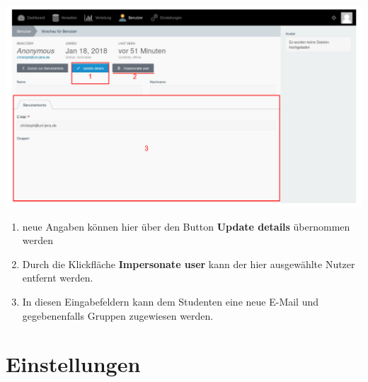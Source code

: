   
  \includegraphics[scale=0.3]{backend/img/users_3.pdf}
  \begin{enumerate}
   \item neue Angaben können hier über den Button \textbf{Update details} übernommen werden
   \item Durch die Klickfläche \textbf{Impersonate user} kann der hier ausgewählte Nutzer entfernt werden.
   \item In diesen Eingabefeldern kann dem Studenten eine neue E-Mail und gegebenenfalls Gruppen zugewiesen werden.
  \end{enumerate}

  
  
  \section{Einstellungen}
  \label{section:settings}
  
